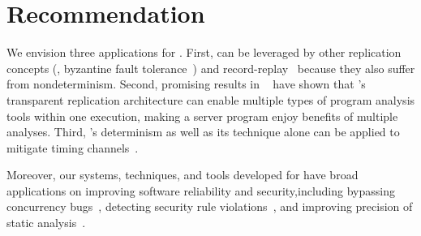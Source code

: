 

\section{Recommendation} \label{sec:recommendation}
We envision three applications for \xxx. First, \xxx can 
be leveraged by other replication concepts (\eg, byzantine fault 
tolerance~\cite{pbft:osdi99, zyzzyva:sosp07}) 
and record-replay~\cite{scribe:sigmetrics10, racepro:sosp11, respec:asplos10} 
because they also suffer from nondeterminism. Second, promising 
results in \repframe~\cite{repframe:apsys15} have shown that \xxx's transparent 
replication architecture can enable multiple types of program analysis tools 
within one execution, making a server program enjoy benefits of multiple 
analyses. Third, \xxx's determinism as well as its \timealgo technique alone 
can be applied to mitigate timing channels~\cite{Askarov:ccs10, Zhang:ccs11, 
Aviram:ccsw10}.

Moreover, our systems, techniques, and tools developed 
for \xxx have broad applications on improving software reliability and 
security,including bypassing concurrency bugs~\cite{wu:loom:osdi10}, detecting 
security rule violations~\cite{woodpecker:asplos13}, and improving precision of 
static analysis~\cite{wu:pldi12}. 

% 
